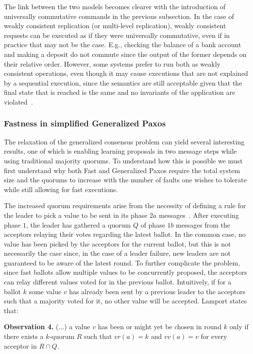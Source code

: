 The link between the two models becomes clearer with the introduction of 
universally commutative commands in the previous subsection.
In the case of weakly consistent replication (or multi-level replication),
weakly consistent requests can be executed as if they were universally
commutative, even if in practice that may not be the case. E.g., checking 
the balance of a bank account and making a deposit do not commute since
the output of the former depends on their relative order. However,
some systems prefer to run both as weakly consistent operations, even
though it may cause executions that are not explained by a sequential
execution, since the semantics are still acceptable given
that the final state that is reached is the same and no invariants 
of the application are violated~\cite{Li2012}.

\iffalse 
\subsubsection{Fastness in simplified Generalized Paxos} 
The relaxation of the generalized consensus problem can yield several interesting results, one of which is enabling learning proposals in two message steps while using traditional majority quorums. To understand how this is possible we must first understand why both Fast and Generalized Paxos require the total system size and the quorums to increase with the number of faults one wishes to tolerate while still allowing for fast executions. \par
The increased quorum requirements arise from the necessity of defining a rule for the leader to pick a value to be sent in its phase $2a$ messages~\cite{Lamport2006}. After executing phase $1$, the leader has gathered a quorum $Q$ of phase $1b$ messages from the acceptors relaying their votes regarding the latest ballot. In the common case, no value has been picked by the acceptors for the current ballot, but this is not necessarily the case since, in the case of a leader failure, new leaders are not guaranteed to be aware of the latest round. To further complicate the problem, since fast ballots allow multiple values to be concurrently proposed, the acceptors can relay different values voted for in the previous ballot. Intuitively, if for a ballot $k$ some value $v$ has already been sent by a previous leader to the acceptors such that a majority voted for it, no other value will be accepted. Lamport states that:\par

\begin{displayquote}
	\textbf{Observation 4.} (...) a value $v$ has been or might yet be chosen in round $k$ only if there exists a $k$-quorum $R$ such that $vr(a)=k$ and $vv(a)=v$ for every acceptor in $R \cap Q$.
\end{displayquote}

